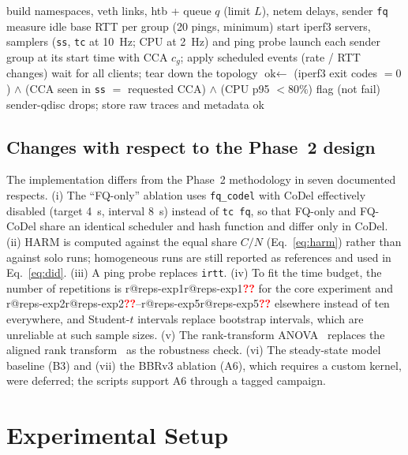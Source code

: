 \documentclass[conference]{IEEEtran}
\makeatletter
\newcommand{\R}[1]{\ifcsname r@#1\endcsname\csname r@#1\endcsname\else\textcolor{red}{\textbf{??}}\fi}
\makeatother
\begin{document}
\begin{algorithm}[t]
\caption{\textsc{Run}$(c,r)$: one validated run}
\label{alg:run}
\begin{algorithmic}[1]
\State build namespaces, veth links, htb + queue $q$ (limit $L$), netem delays, sender \texttt{fq}
\State measure idle base RTT per group (20 pings, minimum)
\State start iperf3 servers, samplers (\texttt{ss}, \texttt{tc} at 10~Hz; CPU at 2~Hz) and ping probe
\State launch each sender group at its start time with CCA $c_g$; apply scheduled events (rate / RTT changes)
\State wait for all clients; tear down the topology
\State $\text{ok}\gets$ (iperf3 exit codes $=0$) $\wedge$ (CCA seen in \texttt{ss} $=$ requested CCA) $\wedge$ (CPU p95 $<80\%$)
\State flag (not fail) sender-qdisc drops; store raw traces and metadata
\State \Return ok
\end{algorithmic}
\end{algorithm}

\subsection{Changes with respect to the Phase~2 design}
The implementation differs from the Phase~2 methodology in seven documented respects. (i) The ``FQ-only'' ablation uses \texttt{fq\_codel} with CoDel effectively disabled (target 4~s, interval 8~s) instead of \texttt{tc fq}, so that FQ-only and FQ-CoDel share an identical scheduler and hash function and differ only in CoDel. (ii) HARM is computed against the equal share $C/N$ (Eq.~\ref{eq:harm}) rather than against solo runs; homogeneous runs are still reported as references and used in Eq.~\ref{eq:did}. (iii) A ping probe replaces \texttt{irtt}. (iv) To fit the time budget, the number of repetitions is \R{reps-exp1} for the core experiment and \R{reps-exp2}--\R{reps-exp5} elsewhere instead of ten everywhere, and Student-$t$ intervals replace bootstrap intervals, which are unreliable at such sample sizes. (v) The rank-transform ANOVA~\cite{conover1981rank} replaces the aligned rank transform~\cite{wobbrock2011art} as the robustness check. (vi) The steady-state model baseline (B3) and (vii) the BBRv3 ablation (A6), which requires a custom kernel, were deferred; the scripts support A6 through a tagged campaign.

\section{Experimental Setup}
\label{sec:setup}
\end{document}

